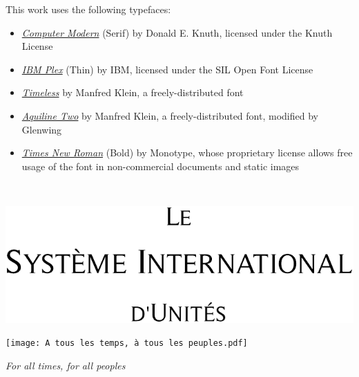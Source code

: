 \documentclass[a4paper]{article}
\renewcommand{\,}{\hspace{0.2em}} %
\begin{document}
This work uses the following typefaces:
\begin{itemize}
\setlength\itemsep{0.25em}
\item{\textsl{\href{https://www.ctan.org/tex-archive/fonts/cm/}{Computer Modern}} (Serif) by Donald E. Knuth, licensed under the Knuth License}
\item{\textsl{\href{https://github.com/IBM/plex}{IBM Plex}} (Thin) by IBM, licensed under the SIL Open Font License}
\item{\textsl{\href{http://fontpro.com/timeless-font-5159}{Timeless}} by Manfred Klein, a freely-distributed font}
\item{\textsl{\href{http://fontpro.com/aquiline-two-font-3337}{Aquiline Two}} by Manfred Klein, a freely-distributed font, modified by Glenwing}
\item{\textsl{\href{https://catalog.monotype.com/font/monotype/times-new-roman/bold}{Times New Roman}} (Bold) by Monotype, whose proprietary license allows free usage of the font in non-commercial documents and static images}
\end{itemize}


\setlength\lineskip{1.2em}
\setlength{\parskip}{0em}

\newpage


~
\vspace{2cm}

\begin{center}
\includegraphics{Le Système International d'Unités Timeless.pdf}
\end{center}

\vspace{6cm}

\begin{center}
\texttt{[image: A tous les temps, à tous les peuples.pdf]}
\end{center}

\vspace{2mm}

\begin{center}
\huge\textsl{For all times, for all peoples}
\end{center}
\end{document}
